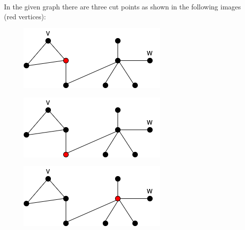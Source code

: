 \documentclass{article}
\begin{document}
    In the given graph there are three cut points as shown in the following images (red vertices):
    
    \begin{figure}[H]
        \centering
        \begin{minipage}[b]{0.4\textwidth}
            \includegraphics[width=\textwidth]{9.1.png}
            \label{fig:figure-6-1}
        \end{minipage}
        \hfill
        \begin{minipage}[b]{0.4\textwidth}
            \includegraphics[width=\textwidth]{9.2.png}
            \label{fig:figure-6-2}
        \end{minipage}
        \hfill
        \begin{minipage}[b]{0.4\textwidth}
            \includegraphics[width=\textwidth]{9.3.png}
            \label{fig:figure-6-3}
        \end{minipage}
    \end{figure}
    
\end{document}
